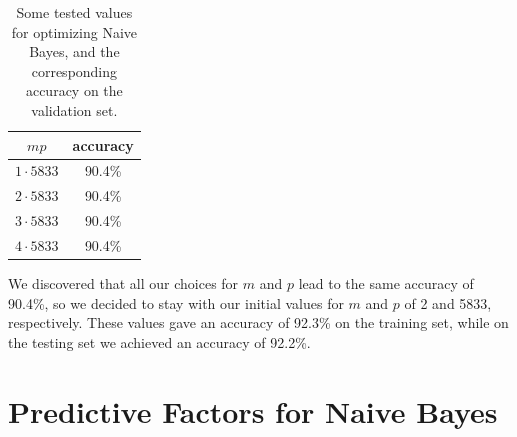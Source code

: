 \documentclass{article}
\renewcommand{\arraystretch}{1.25}
\begin{document}
      \begin{table}[h]
         \centering
         \renewcommand{\arraystretch}{1.5}

         \begin{tabular}{ c|c }
            \hline
            $mp$ & accuracy \\
            \hline \hline
            $1 \cdot 5833$ & 90.4\% \\
            $2 \cdot 5833$ &  90.4\% \\
            $3 \cdot 5833$ &  90.4\%  \\
            $4 \cdot 5833$ &  90.4\%  \\
            \hline
         \end{tabular}

         \caption{ Some tested values for optimizing Naive Bayes, and the corresponding accuracy on the
               validation set.}
      \end{table}


   We discovered that all our choices for $m$ and $p$ lead to the same accuracy of 90.4\%, so we decided to stay with our initial values for $m$ and $p$ of 2 and 5833, respectively. 
   These values gave an accuracy of 92.3\% on the training set, while on the testing set
   we achieved an accuracy of 92.2\%.


   \section{Predictive Factors for Naive Bayes}
\end{document}
